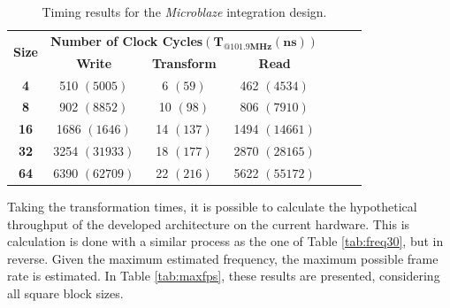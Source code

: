 \begin{table}[!htpb]
    \centering
    \caption{Timing results for the \emph{Microblaze} integration design.}
    \begin{tabular}{ccccccc} \toprule
        \multirow{2}{*}{\textbf{Size}}   & \multicolumn{3}{c}{\textbf{Number of Clock Cycles}$\mathbf{(T_{@101.9MHz}(ns))}$}                      \\
                                         & \textbf{Write} & \textbf{Transform} & \textbf{Read}  \\ \toprule
        \textbf{4}                       & 510 $(5005)$   & 6 $(59)$           & 462 $(4534)$   \\
        \textbf{8}                       & 902 $(8852)$   & 10 $(98)$          & 806 $(7910)$   \\
        \textbf{16}                      & 1686 $(1646)$  & 14 $(137)$         & 1494 $(14661)$ \\
        \textbf{32}                      & 3254 $(31933)$ & 18 $(177)$         & 2870 $(28165)$ \\
        \textbf{64}                      & 6390 $(62709)$ & 22 $(216)$         & 5622 $(55172)$ \\
        \bottomrule
    \end{tabular}
    \label{tab:axi4time}
\end{table}

Taking the transformation times, it is possible to calculate the hypothetical throughput of the developed architecture on the current hardware. %
This is calculation is done with a similar process as the one of Table \ref{tab:freq30}, but in reverse. Given the maximum estimated frequency, the maximum possible frame rate is estimated. In Table \ref{tab:maxfps}, these results are presented, considering all square block sizes.


